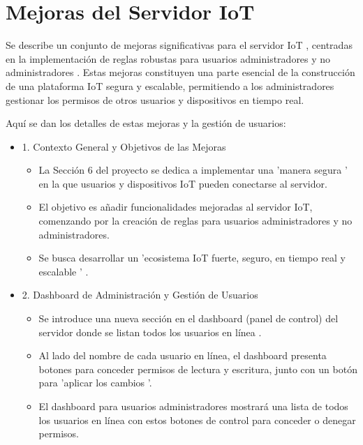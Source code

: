 \documentclass{report}
\begin{document}
\section{Mejoras del Servidor IoT}
Se describe un conjunto de  mejoras significativas para el servidor IoT , centradas en la implementación de  reglas robustas para 
usuarios administradores y no administradores . Estas mejoras constituyen una parte esencial de la construcción de una plataforma IoT segura 
y escalable, permitiendo a los administradores gestionar los permisos de otros usuarios y dispositivos en tiempo real.

Aquí se dan los detalles de estas mejoras y la gestión de usuarios:
\begin{itemize}
    \item 1. Contexto General y Objetivos de las Mejoras
    \begin{itemize}
        \item La Sección 6 del proyecto se dedica a implementar una   'manera segura '  en la que usuarios y dispositivos IoT pueden conectarse 
        al servidor.
        \item El objetivo es  añadir funcionalidades mejoradas  al servidor IoT, comenzando por la creación de reglas para usuarios administradores 
        y no administradores.
        \item Se busca desarrollar un   'ecosistema IoT fuerte, seguro, en tiempo real y escalable ' .
    \end{itemize}

    \item 2. Dashboard de Administración y Gestión de Usuarios
    \begin{itemize}
        \item Se introduce una  nueva sección en el dashboard  (panel de control) del servidor donde se listan todos los  usuarios en línea .
        \item Al lado del nombre de cada usuario en línea, el dashboard presenta  botones para conceder permisos de lectura y escritura, junto con 
        un botón para  'aplicar los cambios '.
        \item El dashboard para usuarios administradores mostrará una lista de todos los usuarios en línea con estos botones de control para 
        conceder o denegar permisos.
    \end{itemize}


\end{itemize}
\end{document}
